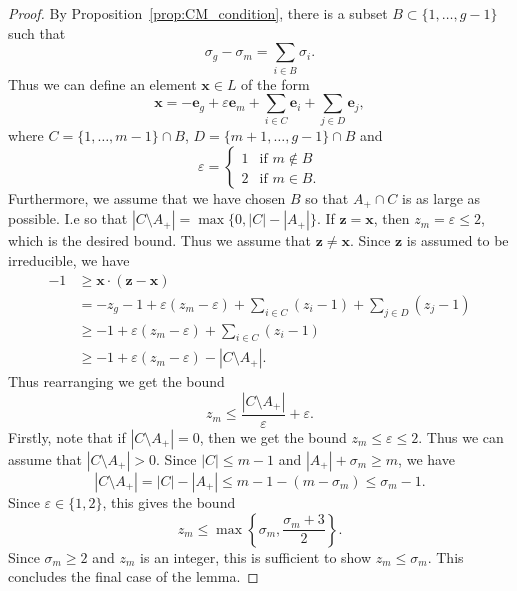 \documentclass[10pt,a4paper]{amsart}
\newcommand{\e}{\bm{e}}
\begin{document}
\begin{proof}
By Proposition~\ref{prop:CM_condition}, there is a subset
$B\subset \{1, \dots, g-1 \}$ such that
\[
\sigma_g - \sigma_m= \sum_{i\in B}\sigma_i.
\]
Thus we can define an element $\bm{x}\in L$ of the form
\[
\bm{x}=-\e_g + \varepsilon \e_m + \sum_{i\in C} \e_i +\sum_{j\in D} \e_j,
\]
where $C=\{1,\dots, m-1\}\cap B$, $D= \{m+1, \dots, g-1\}\cap B$ and
\[
\varepsilon=\begin{cases}
    1 &\text{if $m\not\in B$}\\
    2 &\text{if $m\in B$.}
\end{cases}
\]
Furthermore, we assume that we have chosen $B$ so that $A_+\cap C$ is as large as possible. I.e so that $|C\setminus A_+|=\max\{0, |C|-|A_+| \}$. If $\bm{z}=\bm{x}$, then $z_m=\varepsilon\leq 2$, which is the desired bound. Thus we assume that $\bm{z}\neq \bm{x}$.
Since $\bm{z}$ is assumed to be irreducible, we have 
\begin{align*}
    -1&\geq \bm{x}\cdot (\bm{z}-\bm{x}) \\
    &=-z_g-1 + \varepsilon(z_m -\varepsilon) + \sum_{i\in C} (z_i-1) +\sum_{j\in D} (z_j-1)\\
    &\geq -1 + \varepsilon(z_m -\varepsilon) + \sum_{i\in C} (z_i-1)\\
    &\geq -1 + \varepsilon(z_m -\varepsilon) -|C\setminus A_+|.
\end{align*}
Thus rearranging we get the bound
\[
z_m\leq \frac{|C\setminus A_+|}{\varepsilon} +\varepsilon.
\]
Firstly, note that if $|C\setminus A_+|=0$, then we get the bound $z_m\leq \varepsilon\leq 2$. Thus we can assume that
$|C\setminus A_+|>0$. Since $|C|\leq m-1$ and $|A_+|+\sigma_m\geq m$, we have 
\[
|C\setminus A_+|=|C|-|A_+|\leq m-1-(m-\sigma_m)\leq \sigma_m -1.
\]
Since $\varepsilon\in \{1,2\}$, this gives the bound
\[
z_m\leq \max\left\{\sigma_m, \frac{\sigma_m+3}{2}\right\}.
\]
Since $\sigma_m\geq 2$ and $z_m$ is an integer, this is sufficient to show $z_m \leq \sigma_m$. This concludes the final case of the lemma.
\end{proof}
\end{document}
